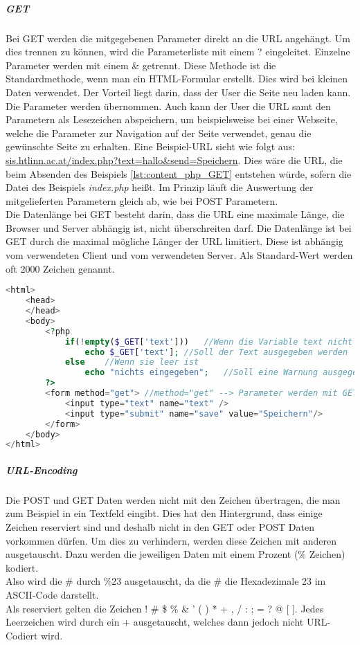 \subparagraph{GET\\}
Bei GET werden die mitgegebenen Parameter direkt an die URL angehängt. Um dies trennen zu können, wird die Parameterliste mit einem ? eingeleitet. Einzelne Parameter werden mit einem \& getrennt. Diese Methode ist die Standardmethode, wenn man ein HTML-Formular erstellt. Dies wird bei kleinen Daten verwendet. Der Vorteil liegt darin, dass der User die Seite neu laden kann. Die Parameter werden übernommen. Auch kann der User die URL samt den Parametern als Lesezeichen abspeichern, um beispielsweise bei einer Webseite, welche die Parameter zur Navigation auf der Seite verwendet, genau die gewünschte Seite zu erhalten. Eine Beispiel-URL sieht wie folgt aus: \url{sis.htlinn.ac.at/index.php?text=hallo\&send=Speichern}. Dies wäre die URL, die beim Absenden des Beispiels \ref{lst:content_php_GET} entstehen würde, sofern die Datei des Beispiels \textit{index.php} heißt. Im Prinzip läuft die Auswertung der mitgelieferten Parametern gleich ab, wie bei POST Parametern.\\
Die Datenlänge bei GET besteht darin, dass die URL eine maximale Länge, die Browser und Server abhängig ist, nicht überschreiten darf.
Die Datenlänge ist bei GET durch die maximal mögliche Länger der URL limitiert. Diese ist abhängig vom verwendeten Client und vom verwendeten Server. Als Standard-Wert werden oft 2000 Zeichen genannt.
\begin{lstlisting}[style=custom, language=PHP,  caption={Beispiel GET},label={lst:content_php_GET}]
<html>
	<head>
	</head>
	<body>
		<?php
			if(!empty($_GET['text']))	//Wenn die Variable text nicht leer ist
				echo $_GET['text'];	//Soll der Text ausgegeben werden
			else	//Wenn sie leer ist
				echo "nichts eingegeben";	//Soll eine Warnung ausgegeben werden
		?>
		<form method="get">	//method="get" --> Parameter werden mit GET mitgegeben
			<input type="text" name="text" />
			<input type="submit" name="save" value="Speichern"/>
		</form>
	</body>
</html>
\end{lstlisting}
\subparagraph{URL-Encoding\\}
Die POST und GET Daten werden nicht mit den Zeichen übertragen, die man zum Beispiel in ein Textfeld eingibt. Dies hat den Hintergrund, dass einige Zeichen reserviert sind und deshalb nicht in den GET oder POST Daten vorkommen dürfen. Um dies zu verhindern, werden diese Zeichen mit anderen ausgetauscht. Dazu werden die jeweiligen Daten mit einem Prozent (\% Zeichen) kodiert.\\
Also wird die \# durch \%23 ausgetauscht, da die \# die Hexadezimale 23 im ASCII-Code darstellt.\\
Als reserviert gelten die Zeichen ! \# \$ \% \& ' ( ) * + , / : ; = ? @ [ ]. Jedes Leerzeichen wird durch ein + ausgetauscht, welches dann jedoch nicht URL-Codiert wird.
